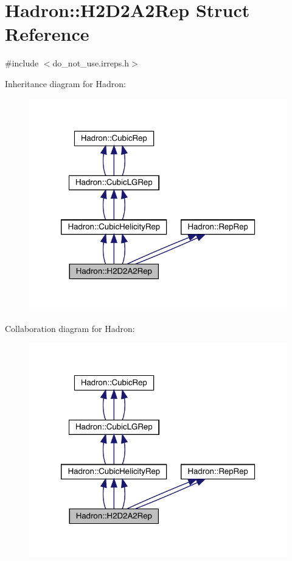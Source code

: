 \hypertarget{structHadron_1_1H2D2A2Rep}{}\section{Hadron\+:\+:H2\+D2\+A2\+Rep Struct Reference}
\label{structHadron_1_1H2D2A2Rep}


{\ttfamily \#include $<$do\+\_\+not\+\_\+use.\+irreps.\+h$>$}



Inheritance diagram for Hadron\+:
\nopagebreak
\begin{figure}[H]
\begin{center}
\leavevmode
\includegraphics[width=320pt]{d3/d3e/structHadron_1_1H2D2A2Rep__inherit__graph}
\end{center}
\end{figure}


Collaboration diagram for Hadron\+:
\nopagebreak
\begin{figure}[H]
\begin{center}
\leavevmode
\includegraphics[width=320pt]{dd/d75/structHadron_1_1H2D2A2Rep__coll__graph}
\end{center}
\end{figure}
